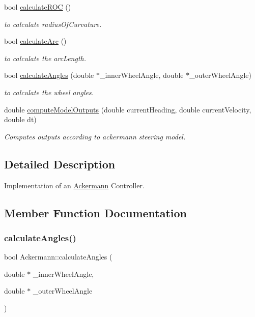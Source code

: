 \begin{DoxyCompactItemize}
bool \hyperlink{classAckermann_aef4ea40841c9a1bb8ad0847f5fe29d93}{calculate\+R\+OC} ()
\begin{DoxyCompactList}\small\item\em to calculate radius\+Of\+Curvature. \end{DoxyCompactList}\item 
bool \hyperlink{classAckermann_aeda04f68ce78522c4582246e0c14c625}{calculate\+Arc} ()
\begin{DoxyCompactList}\small\item\em to calculate the arc\+Length. \end{DoxyCompactList}\item 
bool \hyperlink{classAckermann_ad01dde18c335dfda26f4f6e3729f6cdf}{calculate\+Angles} (double $\ast$\+\_\+inner\+Wheel\+Angle, double $\ast$\+\_\+outer\+Wheel\+Angle)
\begin{DoxyCompactList}\small\item\em to calculate the wheel angles. \end{DoxyCompactList}\item 
double \hyperlink{classAckermann_a61fd011325719efd9e60f1dbab919d29}{compute\+Model\+Outputs} (double current\+Heading, double current\+Velocity, double dt)
\begin{DoxyCompactList}\small\item\em Computes outputs according to ackermann steering model. \end{DoxyCompactList}\end{DoxyCompactItemize}


\subsection{Detailed Description}
Implementation of an \hyperlink{classAckermann}{Ackermann} Controller. 

\subsection{Member Function Documentation}
\mbox{\label{classAckermann_ad01dde18c335dfda26f4f6e3729f6cdf}} 
\subsubsection{\texorpdfstring{calculate\+Angles()}{calculateAngles()}}
{\footnotesize\ttfamily bool Ackermann\+::calculate\+Angles (\begin{DoxyParamCaption}\item[{double $\ast$}]{\+\_\+inner\+Wheel\+Angle,  }\item[{double $\ast$}]{\+\_\+outer\+Wheel\+Angle }\end{DoxyParamCaption})}




